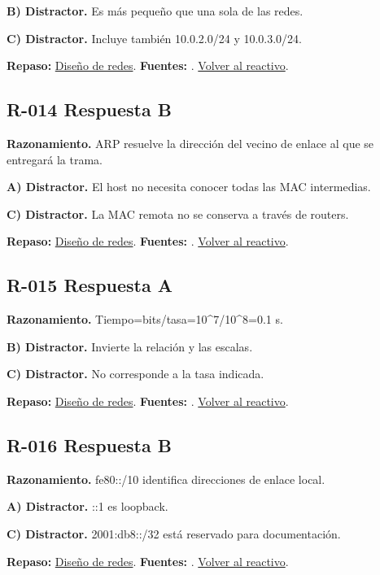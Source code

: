\textbf{B) Distractor. }Es más pequeño que una sola de las redes.

\textbf{C) Distractor. }Incluye también 10.0.2.0/24 y 10.0.3.0/24.

\textbf{Repaso:} \hyperref[sec:r1]{Diseño de redes}. \textbf{Fuentes:} \cite{rfc8200,rfc4632,networks,vlan}. \hyperref[q:R-013]{Volver al reactivo}.\par\medskip

\subsection*{R-014 \quad Respuesta B}\label{s:R-014}
\textbf{Razonamiento.} ARP resuelve la dirección del vecino de enlace al que se entregará la trama.

\textbf{A) Distractor. }El host no necesita conocer todas las MAC intermedias.

\textbf{C) Distractor. }La MAC remota no se conserva a través de routers.

\textbf{Repaso:} \hyperref[sec:r1]{Diseño de redes}. \textbf{Fuentes:} \cite{rfc8200,rfc4632,networks,vlan}. \hyperref[q:R-014]{Volver al reactivo}.\par\medskip

\subsection*{R-015 \quad Respuesta A}\label{s:R-015}
\textbf{Razonamiento.} Tiempo=bits/tasa=10\textasciicircum{}7/10\textasciicircum{}8=0.1 s.

\textbf{B) Distractor. }Invierte la relación y las escalas.

\textbf{C) Distractor. }No corresponde a la tasa indicada.

\textbf{Repaso:} \hyperref[sec:r1]{Diseño de redes}. \textbf{Fuentes:} \cite{rfc8200,rfc4632,networks,vlan}. \hyperref[q:R-015]{Volver al reactivo}.\par\medskip

\subsection*{R-016 \quad Respuesta B}\label{s:R-016}
\textbf{Razonamiento.} fe80::/10 identifica direcciones de enlace local.

\textbf{A) Distractor. }::1 es loopback.

\textbf{C) Distractor. }2001:db8::/32 está reservado para documentación.

\textbf{Repaso:} \hyperref[sec:r1]{Diseño de redes}. \textbf{Fuentes:} \cite{rfc8200,rfc4632,networks,vlan}. \hyperref[q:R-016]{Volver al reactivo}.\par\medskip

